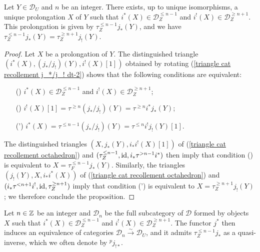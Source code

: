 \begin{proposition}\label{triangle cat recollement prolongation exist}
Let $Y\in\mathcal{D}_U$ and $n$ be an integer. There exists, up to unique isomorphisms, a unique prolongation $X$ of $Y$ such that $i^*(X)\in\mathcal{D}_Z^{\leq n-1}$ and $i^!(X)\in\mathcal{D}_Z^{\geq n+1}$. This prolongation is given by $\tau^{\leq n-1}_Zj_*(Y)$, and we have $\tau^{\leq n-1}_Zj_*(Y)=\tau^{\geq n+1}_Zj_!(Y)$.
\end{proposition}
\begin{proof}
Let $X$ be a prolongation of $Y$. The distinguished triangle $(i^*(X),(j_*/j_!)(Y),i^!(X)[1])$ obtained by rotating (\ref{triangle cat recollement j_*/j_! dt-2}) shows that the following conditions are equivalent:
\begin{enumerate}
    \item[(\rmnum{1})] $i^*(X)\in\mathcal{D}_Z^{\leq n-1}$ and $i^!(X)\in\mathcal{D}_Z^{\geq n+1}$;
    \item[(\rmnum{2})] $i^!(X)[1]=\tau^{\geq n}(j_*/j_!)(Y)=\tau^{\geq n}i^*j_*(Y)$;
    \item[(\rmnum{2}')] $i^*(X)=\tau^{\leq n-1}(j_*/j_!)(Y)=\tau^{\leq n}i^!j_!(Y)[1]$. 
\end{enumerate}
The distinguished triangles $(X,j_*(Y),i_*i^!(X)[1])$ of (\ref{triangle cat recollement octahedron}) and $(\tau^{\leq n-1}_Z,\operatorname{id},i_*\tau^{>n-1}i^*)$ then imply that condition () is equivalent to $X=\tau^{\leq n-1}_Fj_*(Y)$. Similarly, the triangles $(j_!(Y),X,i_*i^*(X))$ of (\ref{triangle cat recollement octahedron}) and $(i_*\tau^{<n+1}i^!,\operatorname{id},\tau_Z^{\geq n+1})$ imply that condition (') is equivalent to $X=\tau_Z^{\geq n+1}j_!(Y)$; we therefore conclude the proposition.
\end{proof}

\begin{remark}\label{triangle cat recollement prolongation equivalence by j^*}
Let $n\in\mathbb{Z}$ be an integer and $\mathcal{D}_n$ be the full subcategory of $\mathcal{D}$ formed by objects $X$ such that $i^*(X)\in\mathcal{D}_Z^{\leq n-1}$ and $i^!(X)\in\mathcal{D}_Z^{\geq n+1}$. The functor $j^*$ then induces an equivalence of categories $\mathcal{D}_n\stackrel{\sim}{\to}\mathcal{D}_U$, and it admits $\tau^{\leq n-1}_Zj_*$ as a quasi-inverse, which we often denote by ${^p\!j_{!*}}$.
\end{remark}

